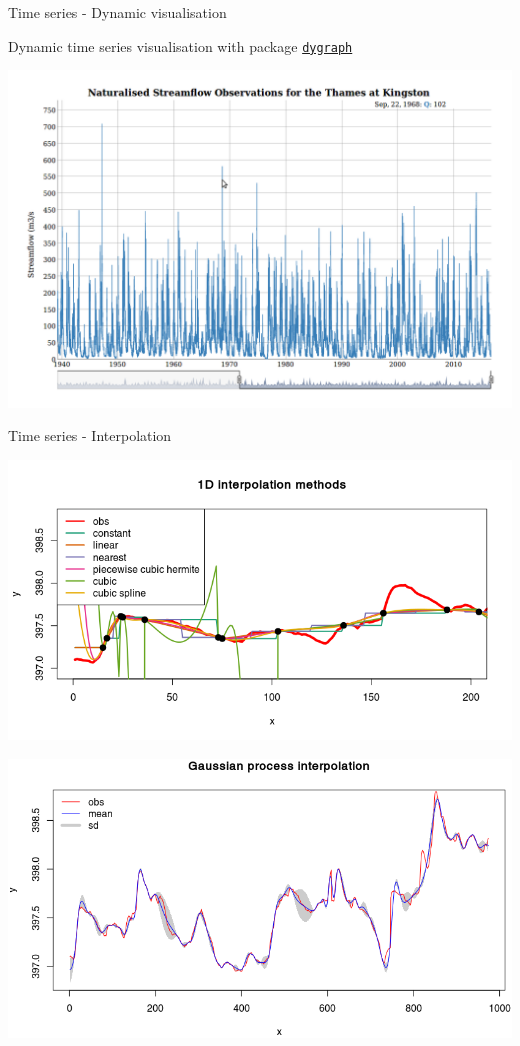 \documentclass[8pt,ignorenonframetext,]{beamer}
\begin{document}
\begin{frame}[fragile]{Time series - Dynamic visualisation}

Dynamic time series visualisation with package
\href{https://cran.r-project.org/web/packages/dygraph/index.html}{\texttt{dygraph}}

\includegraphics{imgPres/dygraph.png}

\end{frame}

\begin{frame}{Time series - Interpolation}

\includegraphics[height=0.35000\textwidth]{imgPres/TS_1D_interp.png}

\includegraphics[height=0.35000\textwidth]{imgPres/TS_GP_interp.png}

\end{frame}
\end{document}
